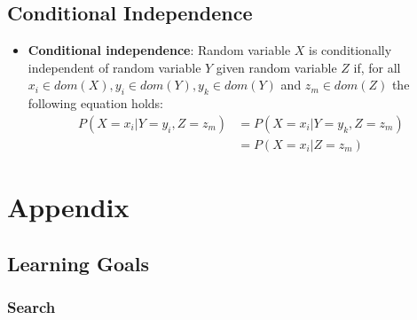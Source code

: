 \documentclass{article}
\begin{document}
\subsection{Conditional Independence}

\begin{itemize}
    \item \textbf{Conditional independence}: Random variable $X$ is conditionally independent of random variable $Y$ given random variable $Z$ if, for all $x_i \in dom(X), y_i \in dom(Y), y_k \in dom(Y)$ and $z_m \in dom(Z)$ the following equation holds:
    \begin{align*}
        P(X = x_i|Y = y_i, Z = z_m) &= P(X = x_i|Y = y_k, Z = z_m) \\
        &= P(X = x_i|Z = z_m)
    \end{align*}
\end{itemize}

\section{Appendix}

\subsection{Learning Goals}

\subsubsection*{Search}
\end{document}
